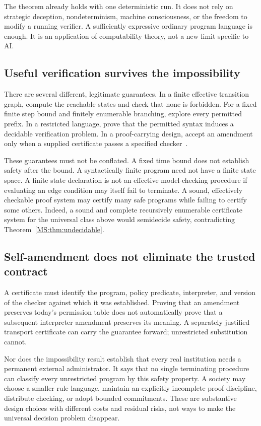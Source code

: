 The theorem already holds with one deterministic run. It does not rely on strategic deception, nondeterminism, machine consciousness, or the freedom to modify a running verifier. A sufficiently expressive ordinary program language is enough. It is an application of computability theory, not a new limit specific to AI.

\subsection{Useful verification survives the impossibility}
There are several different, legitimate guarantees. In a finite effective transition graph, compute the reachable states and check that none is forbidden. For a fixed finite step bound and finitely enumerable branching, explore every permitted prefix. In a restricted language, prove that the permitted syntax induces a decidable verification problem. In a proof-carrying design, accept an amendment only when a supplied certificate passes a specified checker~\cite{MS:necula}.

These guarantees must not be conflated. A fixed time bound does not establish safety after the bound. A syntactically finite program need not have a finite state space. A finite state declaration is not an effective model-checking procedure if evaluating an edge condition may itself fail to terminate. A sound, effectively checkable proof system may certify many safe programs while failing to certify some others. Indeed, a sound and complete recursively enumerable certificate system for the universal class above would semidecide safety, contradicting Theorem~\ref{MS:thm:undecidable}.

\subsection{Self-amendment does not eliminate the trusted contract}
A certificate must identify the program, policy predicate, interpreter, and version of the checker against which it was established. Proving that an amendment preserves today's permission table does not automatically prove that a subsequent interpreter amendment preserves its meaning. A separately justified transport certificate can carry the guarantee forward; unrestricted substitution cannot.

Nor does the impossibility result establish that every real institution needs a permanent external administrator. It says that no single terminating procedure can classify every unrestricted program by this safety property. A society may choose a smaller rule language, maintain an explicitly incomplete proof discipline, distribute checking, or adopt bounded commitments. These are substantive design choices with different costs and residual risks, not ways to make the universal decision problem disappear.

